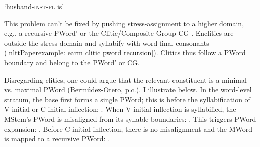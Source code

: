\begin{exe}
	\ex 
	
	\begin{xlist}
		
		\ex {}%
		\ex {}%
		\ex {}%
		\ex {}%
		
		\ex {}`husband-\textsc{inst-pl} is' \label{nlttPaperexample: earm clitic pword recursion}
		
	\end{xlist}\label{nlttPaperexample: final stress earm pword}
	
	
\end{exe}

This problem can't be fixed by pushing stress-assignment to a higher domain, e.g., a recursive PWord' \citep{Peperkamp-1997-ProsodicWord,Selkirk-1996-ProsodicFunctionWords,ItoMester-2009-ExtendedProsodicWord,KabakRevithiadou-2009-InterfaceProsodicWordRecursionUgh} or the Clitic/Composite Group CG \citep{Vogel-2009-StatusCliticGroup,Vogel-2016-LifeAfterSLH}. Enclitics are outside the stress domain and syllabify with word-final consonants (\ref{nlttPaperexample: earm clitic pword recursion}). Clitics thus follow a PWord boundary and belong to the PWord' or CG. 


Disregarding clitics, one could argue that the relevant constituent is a minimal vs. maximal PWord (Berm\'udez-Otero, p.c.). I illustrate below. In the word-level stratum, the base first forms a single PWord; this is before the syllabification of V-initial or C-initial inflection: \textit{}. When V-initial inflection is syllabified, the MStem's PWord is misaligned from its syllable boundaries: \textit{}. This triggers PWord expansion: \textit{}. Before C-initial inflection, there is no misalignment and the MWord is mapped to a recursive PWord: \textit{}.





